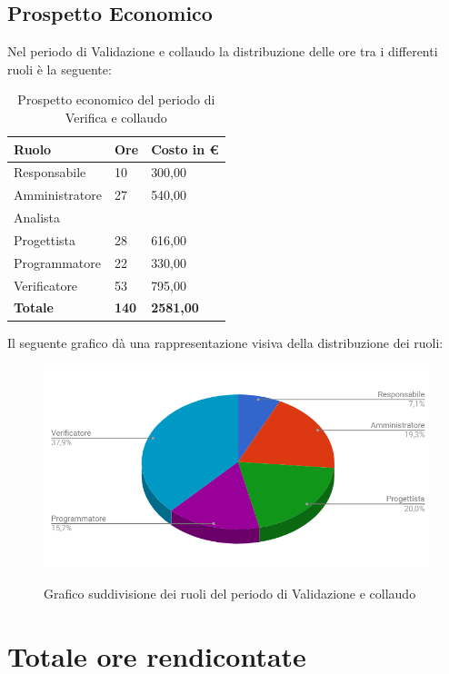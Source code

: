 \documentclass[PianoDiProgetto.tex]{subfiles}
\begin{document}
\subsection{Prospetto Economico}
Nel periodo di Validazione e collaudo la distribuzione delle ore tra i differenti ruoli è la seguente:
\begin{center}
	\begin{table}[htbp]
		\centering
		\renewcommand\arraystretch{1.5}
		\begin{tabularx}{\textwidth}{p{5cm}|p{4cm}|p{4cm}}
			\hline
			\textbf{Ruolo} & \textbf{Ore} & \textbf{Costo in \euro} \\
			\hline
			Responsabile & 10 & 300,00 \\
			\hline
			Amministratore & 27 & 540,00 \\
			\hline
			Analista & \ & \ \\
			\hline
			Progettista & 28 & 616,00 \\
			\hline
			Programmatore & 22 & 330,00 \\
			\hline
			Verificatore & 53 & 795,00 \\
			\hline
			\textbf{Totale} & \textbf{140} & \textbf{2581,00}\\
			\hline
		\end{tabularx}
	\caption{Prospetto economico del periodo di Verifica e collaudo}
	\label{my-label}
	\end{table} 
\end{center}
Il seguente grafico dà una rappresentazione visiva della distribuzione dei ruoli:
\begin{figure}[h]
	\centering
	\includegraphics[width=12.5cm]{images/prospettoEconomico/valCol.png}
	\label{fig:foo}
	\caption{Grafico suddivisione dei ruoli del periodo di Validazione e collaudo}
\end{figure} 
\clearpage
\section{Totale ore rendicontate}
\end{document}
